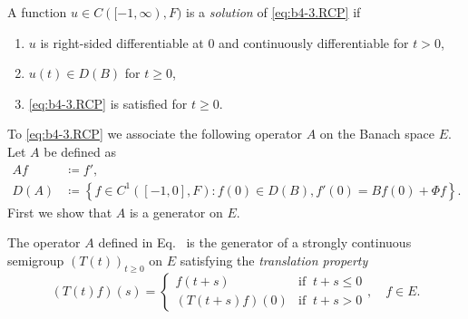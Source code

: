 A function $u \in C([-1,\infty),F)$ is a \emph{solution} of \eqref{eq:b4-3.RCP} if
\begin{enumerate}[\upshape (i)]
	\item 
	$u$ is right-sided differentiable at 0 and continuously differentiable for $t  >  0$,
	
	\item 
	$u(t) \in D(B)$ for $t \geq 0$,
    
	\item 
	 \eqref{eq:b4-3.RCP} is satisfied for $t \geq 0$.
\end{enumerate}
To \eqref{eq:b4-3.RCP} we associate the following operator $A$ on the Banach space $E$.
Let $A$ be defined as
\begin{equation}\label{eq:b4-3.1}
	\begin{aligned}
		Af & \coloneq  f'  ,\\
		D(A) & \coloneq  \left\{f \in C^1([-1,0],F) \colon f(0) \in D(B), f'(0) = Bf(0) + \Phi f\right\} .
	\end{aligned}
\end{equation}
First we show that $A$ is a generator on $E$.
\begin{theorem}\label{thm:b4-3.1}
	The operator $A$ defined in Eq.~ is the generator of a strongly continuous semigroup $(T(t))_{t\geq 0}$ on $E$ satisfying the \emph{translation property}
\begin{equation*}\label{eq:b4-3.T} \tag{T}
    (T(t)f)(s) = 
    \begin{cases} 
        f(t+s) & \text{if } \ t+s \leq 0 \\
        (T(t+s)f)(0) & \text{if } \ t+s  >  0 
    \end{cases}, \quad f \in E .
\end{equation*}
\end{theorem}
